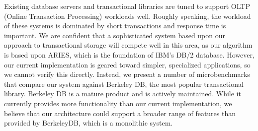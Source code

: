 \documentclass[letterpaper,twocolumn,english]{article}
\begin{document}
Existing database servers and transactional libraries are tuned to
support OLTP (Online Transaction Processing) workloads well.  Roughly
speaking, the workload of these systems is dominated by short
transactions and response time is important.  We are confident that a
sophisticated system based upon our approach to transactional storage
will compete well in this area, as our algorithm is based upon ARIES,
which is the foundation of IBM's DB/2 database.  However, our current
implementation is geared toward simpler, specialized applications, so
we cannot verify this directly.  Instead, we present a number of
microbenchmarks that compare our system against Berkeley DB, the most
popular transactional library.  Berkeley DB is a mature product and is
actively maintained.  While it currently provides more functionality
than our current implementation, we believe that our architecture
could support a broader range of features than provided by BerkeleyDB,
which is a monolithic system.
\end{document}
